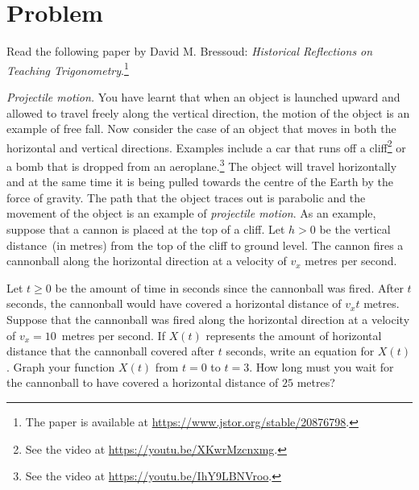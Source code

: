 \documentclass[a4paper,oneside,12pt]{article}
\begin{document}
\newpage

\section*{Problem}

\begin{problem}
\item Read the following paper by David M. Bressoud:
  \emph{Historical Reflections on Teaching Trigonometry}.\footnote{
    The paper is available at
    \url{https://www.jstor.org/stable/20876798}.
  }

\item\label{prob:trigonometric:cannon_cliff}
  \emph{Projectile motion.}
  You have learnt that when an object is launched upward and allowed
  to travel freely along the vertical direction, the motion of the
  object is an example of free fall.  Now consider the case of an
  object that moves in both the horizontal and vertical directions.
  Examples include a car that runs off a cliff\footnote{
    See the video at
    \url{https://youtu.be/XKwrMzcnxmg}.
  }
  or a bomb that is dropped from an aeroplane.\footnote{
    See the video at
    \url{https://youtu.be/IhY9LBNVroo}.
  }
  The object will travel horizontally and at the same time it is being
  pulled towards the centre of the Earth by the force of gravity.  The
  path that the object traces out is parabolic and the movement of the
  object is an example of \emph{projectile motion}.  As an example,
  suppose that a cannon is placed at the top of a cliff.  Let $h > 0$
  be the vertical distance~(in metres) from the top of the cliff to
  ground level.  The cannon fires a cannonball along the horizontal
  direction at a velocity of $v_x$ metres per second.
  \begin{packedenum}
  \item\label{subprob:trigonometric:cannon_cliff_horizontal_displacement}
    Let $t \geq 0$ be the amount of time in seconds since the
    cannonball was fired.  After $t$ seconds, the cannonball would
    have covered a horizontal distance of $v_xt$ metres.  Suppose that
    the cannonball was fired along the horizontal direction at a
    velocity of $v_x = 10$~metres per second.  If $X(t)$ represents
    the amount of horizontal distance that the cannonball covered
    after $t$ seconds, write an equation for $X(t)$.  Graph your
    function $X(t)$ from $t = 0$ to $t = 3$.  How long must you wait
    for the cannonball to have covered a horizontal distance of $25$
    metres?


\end{packedenum}
\end{problem}
\end{document}
